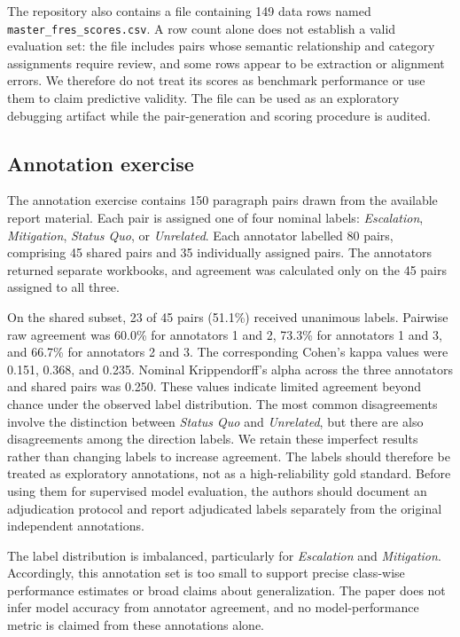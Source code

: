 \documentclass[pdflatex,sn-basic,Numbered]{sn-jnl}
\begin{document}
The repository also contains a file containing 149 data rows named \texttt{master\_fres\_scores.csv}. A row count alone does not establish a valid evaluation set: the file includes pairs whose semantic relationship and category assignments require review, and some rows appear to be extraction or alignment errors. We therefore do not treat its scores as benchmark performance or use them to claim predictive validity. The file can be used as an exploratory debugging artifact while the pair-generation and scoring procedure is audited.

\subsection{Annotation exercise}
The annotation exercise contains 150 paragraph pairs drawn from the available report material. Each pair is assigned one of four nominal labels: \emph{Escalation}, \emph{Mitigation}, \emph{Status Quo}, or \emph{Unrelated}. Each annotator labelled 80 pairs, comprising 45 shared pairs and 35 individually assigned pairs. The annotators returned separate workbooks, and agreement was calculated only on the 45 pairs assigned to all three.

On the shared subset, 23 of 45 pairs (51.1\%) received unanimous labels. Pairwise raw agreement was 60.0\% for annotators 1 and 2, 73.3\% for annotators 1 and 3, and 66.7\% for annotators 2 and 3. The corresponding Cohen's kappa values were 0.151, 0.368, and 0.235. Nominal Krippendorff's alpha across the three annotators and shared pairs was 0.250. These values indicate limited agreement beyond chance under the observed label distribution. The most common disagreements involve the distinction between \emph{Status Quo} and \emph{Unrelated}, but there are also disagreements among the direction labels. We retain these imperfect results rather than changing labels to increase agreement. The labels should therefore be treated as exploratory annotations, not as a high-reliability gold standard. Before using them for supervised model evaluation, the authors should document an adjudication protocol and report adjudicated labels separately from the original independent annotations.

The label distribution is imbalanced, particularly for \emph{Escalation} and \emph{Mitigation}. Accordingly, this annotation set is too small to support precise class-wise performance estimates or broad claims about generalization. The paper does not infer model accuracy from annotator agreement, and no model-performance metric is claimed from these annotations alone.
\end{document}
